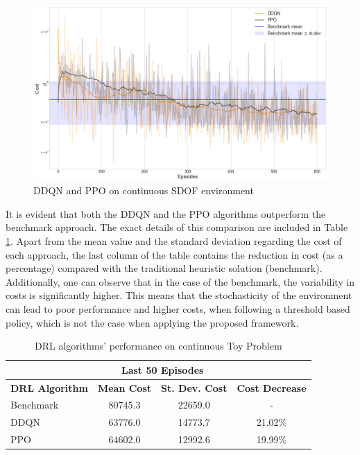 \begin{figure}[H]
    \centering
	\includegraphics[width=\linewidth]{Figures/continuousAllAlgs.png}
	\caption{\gls{DDQN} and \gls{PPO} on continuous \gls{SDOF} environment}
	\label{continuousAllAlgs}
\end{figure}

It is evident that both the \gls{DDQN} and the \gls{PPO} algorithms outperform the benchmark approach. The exact details of this comparison are included in Table \ref{costsContinuous}. Apart from the mean value and the standard deviation regarding the cost of each approach, the last column of the table contains the reduction in cost (as a percentage) compared with the traditional heuristic solution (benchmark). Additionally, one can observe that in the case of the benchmark, the variability in costs is significantly higher. This means that the stochasticity of the environment can lead to poor performance and higher costs, when following a threshold based policy, which is not the case when applying the proposed framework.

\begin{table}[H]
    \centering
    \caption{\gls{DRL} algorithms' performance on continuous Toy Problem}
    \label{costsContinuous}
    \begin{tabular}{lccc}
        & \multicolumn{2}{c}{\textbf{Last 50   Episodes}} & \\ \toprule
        \textbf{\gls{DRL} Algorithm} & \textbf{Mean Cost} & \textbf{St. Dev. Cost} & \textbf{Cost Decrease} \\ \toprule
        Benchmark & 80745.3 & 22659.0 & - \\
        \gls{DDQN} & 63776.0 & 14773.7 & 21.02\% \\
        \gls{PPO} & 64602.0 & 12992.6 & 19.99\% \\ \bottomrule
    \end{tabular}
\end{table}

